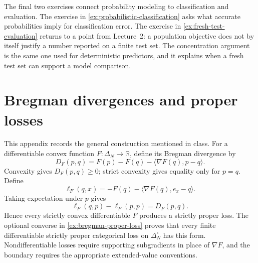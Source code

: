 \documentclass[11pt,twoside]{article}
\newcommand{\R}{\mathbb R}
\theoremstyle{definition}
\theoremstyle{remark}
\begin{document}

The final two exercises connect probability modeling to classification and
evaluation. The exercise in \cref{ex:probabilistic-classification} asks what
accurate probabilities imply for classification error. The exercise in
\cref{ex:fresh-test-evaluation} returns to a point from Lecture~2: a population
objective does not by itself justify a number reported on a finite test set.
The concentration argument is the same one used for deterministic predictors,
and it explains when a fresh test set can support a model comparison.




\clearpage
\appendix

\section{Bregman divergences and proper losses}
\label{app:bregman}

This appendix records the general construction mentioned in class. For a
differentiable convex function $F:\Delta_N\to\R$, define its Bregman
divergence by
\begin{equation}
D_F(p,q)
=F(p)-F(q)-\langle\nabla F(q),p-q\rangle.
\label{eq:bregman-divergence}
\end{equation}
Convexity gives $D_F(p,q)\ge0$; strict convexity gives equality only for
$p=q$. Define
\begin{equation}
\ell_F(q,x)
=-F(q)-\langle\nabla F(q),e_x-q\rangle.
\label{eq:bregman-score}
\end{equation}
Taking expectation under $p$ gives
\begin{equation}
\ell_F(q,p)-\ell_F(p,p)=D_F(p,q).
\label{eq:bregman-regret}
\end{equation}
Hence every strictly convex differentiable $F$ produces a strictly proper
loss. The optional converse in \cref{ex:bregman-proper-loss} proves that every
finite differentiable strictly proper categorical loss on
$\Delta_N^\circ$ has this form. Nondifferentiable losses require supporting
subgradients in place of $\nabla F$, and the boundary requires the appropriate
extended-value conventions.
\end{document}
